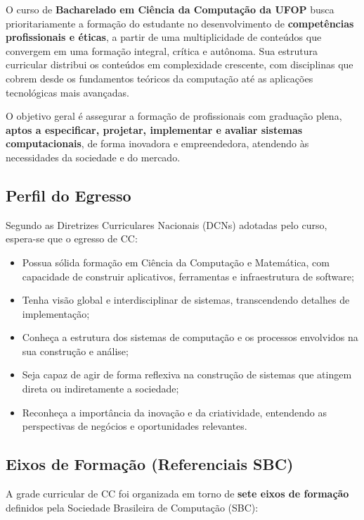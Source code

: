 \documentclass[9pt,a4paper]{extarticle}
\newcommand{\impt}[1]{\textcolor{important}{\textbf{#1}}}
\newcommand{\cc}[1]{\textcolor{cccolor}{\textbf{#1}}}
\begin{document}
O curso de \cc{Bacharelado em Ciência da Computação da UFOP} busca prioritariamente a formação do estudante no desenvolvimento de \textbf{competências profissionais e éticas}, a partir de uma multiplicidade de conteúdos que convergem em uma formação integral, crítica e autônoma. Sua estrutura curricular distribui os conteúdos em complexidade crescente, com disciplinas que cobrem desde os fundamentos teóricos da computação até as aplicações tecnológicas mais avançadas.

O objetivo geral é assegurar a formação de profissionais com graduação plena, \impt{aptos a especificar, projetar, implementar e avaliar sistemas computacionais}, de forma inovadora e empreendedora, atendendo às necessidades da sociedade e do mercado.

\subsection{Perfil do Egresso}

Segundo as Diretrizes Curriculares Nacionais (DCNs) adotadas pelo curso, espera-se que o egresso de CC:

\begin{itemize}
  \item Possua sólida formação em Ciência da Computação e Matemática, com capacidade de construir aplicativos, ferramentas e infraestrutura de software;
  \item Tenha visão global e interdisciplinar de sistemas, transcendendo detalhes de implementação;
  \item Conheça a estrutura dos sistemas de computação e os processos envolvidos na sua construção e análise;
  \item Seja capaz de agir de forma reflexiva na construção de sistemas que atingem direta ou indiretamente a sociedade;
  \item Reconheça a importância da inovação e da criatividade, entendendo as perspectivas de negócios e oportunidades relevantes.
\end{itemize}

\subsection{Eixos de Formação (Referenciais SBC)}

A grade curricular de CC foi organizada em torno de \textbf{sete eixos de formação} definidos pela Sociedade Brasileira de Computação (SBC):
\end{document}
